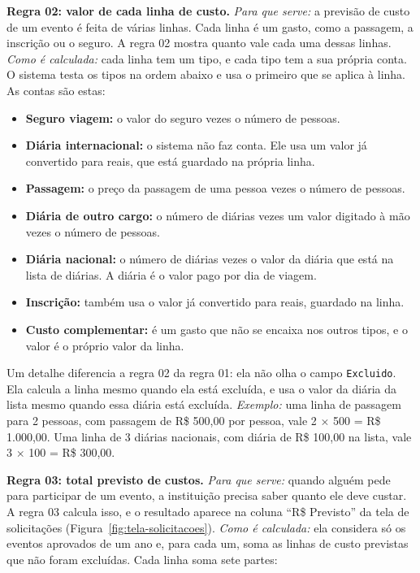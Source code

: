 \textbf{Regra 02: valor de cada linha de custo.} \textit{Para que serve:} a previsão de custo de um evento é feita de várias linhas. Cada linha é um gasto, como a passagem, a inscrição ou o seguro. A regra 02 mostra quanto vale cada uma dessas linhas. \textit{Como é calculada:} cada linha tem um tipo, e cada tipo tem a sua própria conta. O sistema testa os tipos na ordem abaixo e usa o primeiro que se aplica à linha. As contas são estas:

\begin{itemize}
    \item \textbf{Seguro viagem:} o valor do seguro vezes o número de pessoas.
    \item \textbf{Diária internacional:} o sistema não faz conta. Ele usa um valor já convertido para reais, que está guardado na própria linha.
    \item \textbf{Passagem:} o preço da passagem de uma pessoa vezes o número de pessoas.
    \item \textbf{Diária de outro cargo:} o número de diárias vezes um valor digitado à mão vezes o número de pessoas.
    \item \textbf{Diária nacional:} o número de diárias vezes o valor da diária que está na lista de diárias. A diária é o valor pago por dia de viagem.
    \item \textbf{Inscrição:} também usa o valor já convertido para reais, guardado na linha.
    \item \textbf{Custo complementar:} é um gasto que não se encaixa nos outros tipos, e o valor é o próprio valor da linha.
\end{itemize}

Um detalhe diferencia a regra 02 da regra 01: ela não olha o campo \texttt{Excluido}. Ela calcula a linha mesmo quando ela está excluída, e usa o valor da diária da lista mesmo quando essa diária está excluída. \textit{Exemplo:} uma linha de passagem para 2 pessoas, com passagem de R\$ 500,00 por pessoa, vale 2 $\times$ 500 = R\$ 1.000,00. Uma linha de 3 diárias nacionais, com diária de R\$ 100,00 na lista, vale 3 $\times$ 100 = R\$ 300,00.

\textbf{Regra 03: total previsto de custos.} \textit{Para que serve:} quando alguém pede para participar de um evento, a instituição precisa saber quanto ele deve custar. A regra 03 calcula isso, e o resultado aparece na coluna ``R\$ Previsto'' da tela de solicitações (Figura~\ref{fig:tela-solicitacoes}). \textit{Como é calculada:} ela considera só os eventos aprovados de um ano e, para cada um, soma as linhas de custo previstas que não foram excluídas. Cada linha soma sete partes:

